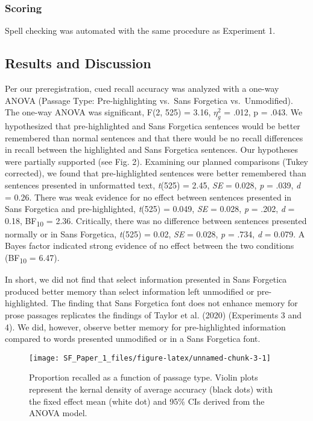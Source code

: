 \documentclass[jou]{apa6}
\begin{document}
\hypertarget{scoring-1}{%
\subsubsection{Scoring}\label{scoring-1}}

Spell checking was automated with the same procedure as Experiment 1.

\hypertarget{results-and-discussion-1}{%
\subsection{Results and Discussion}\label{results-and-discussion-1}}

Per our preregistration, cued recall accuracy was analyzed with a one-way ANOVA (Passage Type: Pre-highlighting vs.~Sans Forgetica vs.~Unmodified). The one-way ANOVA was significant, F(2, 525) = 3.16, \(\eta_{g}^{2}\) = .012, p = .043. We hypothesized that pre-highlighted and Sans Forgetica sentences would be better remembered than normal sentences and that there would be no recall differences in recall between the highlighted and Sans Forgetica sentences. Our hypotheses were partially supported (see Fig. 2). Examining our planned comparisons (Tukey corrected), we found that pre-highlighted sentences were better remembered than sentences presented in unformatted text, \emph{t}(525) = 2.45, \emph{SE} = 0.028, \emph{p }= .039, \emph{d} = 0.26. There was weak evidence for no effect between sentences presented in Sans Forgetica and pre-highlighted, \emph{t}(525) = 0.049, \emph{SE} = 0.028, \emph{p} = .202, \emph{d} = 0.18, BF\textsubscript{10} = 2.36. Critically, there was no difference between sentences presented normally or in Sans Forgetica, \emph{t}(525) = 0.02, \emph{SE} = 0.028, \emph{p} = .734, \emph{d} = 0.079. A Bayes factor indicated strong evidence of no effect between the two conditions (BF\textsubscript{10} = 6.47).

In short, we did not find that select information presented in Sans Forgetica produced better memory than select information left unmodified or pre-highlighted. The finding that Sans Forgetica font does not enhance memory for prose passages replicates the findings of Taylor et al. (2020) (Experiments 3 and 4). We did, however, observe better memory for pre-highlighted information compared to words presented unmodified or in a Sans Forgetica font.

\begin{figure}

{\centering \texttt{[image: SF\_Paper\_1\_files/figure-latex/unnamed-chunk-3-1]} 

}

\caption{Proportion recalled as a function of passage type. Violin plots represent the kernal density of average accuracy (black dots) with the fixed effect mean (white dot) and 95\%  CIs derived from the ANOVA model.}\label{fig:unnamed-chunk-3}
\end{figure}
\end{document}
